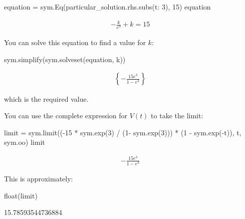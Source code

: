 \begin{pyin}
equation = sym.Eq(particular_solution.rhs.subs({t: 3}), 15)
equation
\end{pyin}




\begin{equation*}
\begin{split}\displaystyle - \frac{k}{e^{3}} + k = 15\end{split}
\end{equation*}




You can solve this equation to find a value for \(k\):




\begin{pyin}
sym.simplify(sym.solveset(equation, k))
\end{pyin}




\begin{equation*}
\begin{split}\displaystyle \left\{- \frac{15 e^{3}}{1 - e^{3}}\right\}\end{split}
\end{equation*}




which is the required value.


You can use the complete expression for \(V(t)\) to take the limit:




\begin{pyin}
limit = sym.limit((-15 * sym.exp(3) / (1- sym.exp(3))) *  (1 - sym.exp(-t)), t, sym.oo)
limit
\end{pyin}




\begin{equation*}
\begin{split}\displaystyle - \frac{15 e^{3}}{1 - e^{3}}\end{split}
\end{equation*}




This is approximately:




\begin{pyin}
float(limit)
\end{pyin}





\begin{raw}
15.78593544736884
\end{raw}





